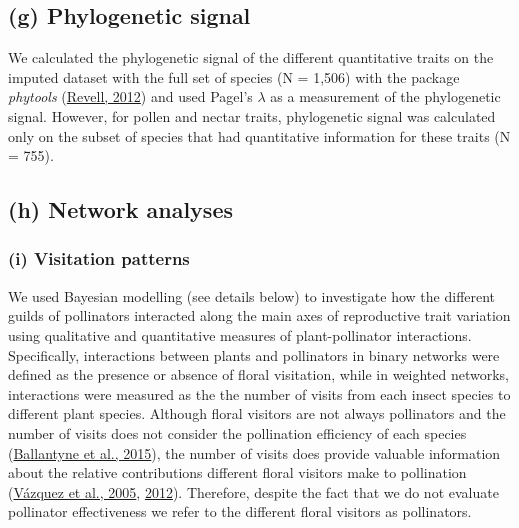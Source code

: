 \documentclass[
  12pt,
  a4paper,
]{article}
\begin{document}
\hypertarget{g-phylogenetic-signal}{%
\subsection{(g) Phylogenetic signal}\label{g-phylogenetic-signal}}

We calculated the phylogenetic signal of the different quantitative traits on the imputed dataset with the full set of species (N = 1,506) with the package \emph{phytools} (\protect\hyperlink{ref-revell2012}{Revell, 2012}) and used Pagel's \(\lambda\) as a measurement of the phylogenetic signal. However, for pollen and nectar traits, phylogenetic signal was calculated only on the subset of species that had quantitative information for these traits (N = 755).

\hypertarget{h-network-analyses}{%
\subsection{(h) Network analyses}\label{h-network-analyses}}

\hypertarget{i-visitation-patterns}{%
\subsubsection{(i) Visitation patterns}\label{i-visitation-patterns}}

We used Bayesian modelling (see details below) to investigate how the different guilds of pollinators interacted along the main axes of reproductive trait variation using qualitative and quantitative measures of plant-pollinator interactions. Specifically, interactions between plants and pollinators in binary networks were defined as the presence or absence of floral visitation, while in weighted networks, interactions were measured as the the number of visits from each insect species to different plant species. Although floral visitors are not always pollinators and the number of visits does not consider the pollination efficiency of each species (\protect\hyperlink{ref-ballantyne2015}{Ballantyne et al., 2015}), the number of visits does provide valuable information about the relative contributions different floral visitors make to pollination (\protect\hyperlink{ref-vazquez2005}{Vázquez et al., 2005}, \protect\hyperlink{ref-vazquez2012}{2012}). Therefore, despite the fact that we do not evaluate pollinator effectiveness we refer to the different floral visitors as pollinators.
\end{document}
